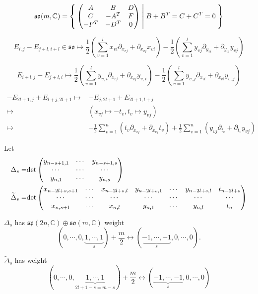\documentclass[12pt]{amsart}
\def\bC{{\mathbb{C}}}
\def\det{{\rm det}}
\def\tDelta{\widetilde{\Delta}}
\def\aso{\mathfrak{so}}
\def\asp{\mathfrak{sp}}
\begin{document}
\[
\aso(m,\bC) = \Set{
\begin{pmatrix} 
A & B & D\\
C & -A^T &F \\
-F^T& -D^T& 0
\end{pmatrix} |
B+B^T=C+C^T=0}
\]

\[
E_{i,j}-E_{j+l,i+l} \in \aso \mapsto 
 \frac{1}{2}(\sum_{v=1}^l x_{vi}\partial_{x_{vj}}+ \partial_{x_{vj}}x_{vi})
-\frac{1}{2}(\sum_{v=1}^l y_{vj}\partial_{y_{vi}}+ \partial_{y_{vi}}y_{vj})
\]

\[
E_{i+l,j}-E_{j+l,i}\mapsto 
 \frac{1}{2}(\sum_{v=1}^l y_{v,i}\partial_{x_{vj}}+\partial_{x_{vj}}y_{v,i})
-\frac{1}{2}(\sum_{v=1}^l y_{v,j}\partial_{x_{vi}}+\partial_{x_{vi}}y_{v,j})
\]

\[
\begin{split}
-E_{2l+1,j}+ E_{l+j,2l+1} \mapsto&
-E_{j,2l+1}+E_{2l+1,l+j} \\
\mapsto&
(x_{vj}\mapsto -t_v, t_v\mapsto y_{vj})\\
\mapsto&
-\frac{1}{2}\sum_{v=1}^n (t_v\partial_{x_{vj}}+\partial_{x_{vj}}t_v)
+\frac{1}{2}\sum_{v=1}^n (y_{vj}\partial_{t_v}+\partial_{t_v}y_{vj})
\end{split}
\]

Let 
\begin{align*}
\Delta_s =& \det\begin{pmatrix}
y_{n-s+1,1} & \cdots & y_{n-s+1, s} \\
\cdots & \cdots & \cdots \\
y_{n,1} & \cdots & y_{n,s}
\end{pmatrix}\\
\tDelta_s = & \det\begin{pmatrix}
x_{n-2l+s, s+1} & \cdots & x_{n-2l+s,l} & y_{n-2l+s,1} & \cdots & y_{n-2l+s,l}&t_{n-2l+s}\\
\cdots&\cdots&\cdots&\cdots&\cdots&\cdots &\cdots \\
x_{n, s+1} & \cdots & x_{n,l} & y_{n,1} & \cdots & y_{n,l}& t_n
\end{pmatrix}
\end{align*}

$\Delta_s$ has $\asp(2n,\bC)\oplus \aso(m,\bC)$ weight 
\[
(0, \cdots, 0, \underbrace{1, \cdots, 1}_s)+\frac{m}{2}
\leftrightarrow
(\underbrace{-1,\cdots, -1}_s, 0,\cdots, 0) .
\]

$\tDelta_s$ has weight
\[
(0, \cdots, 0, \underbrace{1,\cdots, 1}_{2l+1-s=m-s})+\frac{m}{2}
\leftrightarrow (\underbrace{-1,\cdots, -1}_s, 0,\cdots, 0)
\]
\end{document}
